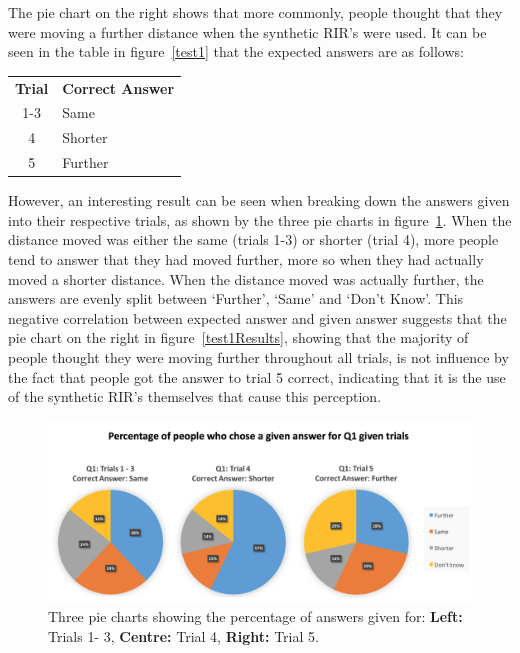 \documentclass[../../main.tex]{subfiles}
\begin{document}
			The pie chart on the right shows that more commonly, people thought that they were moving a further distance when the synthetic \ac{RIR}'s were used. It can be seen in the table in figure~\ref{test1} that the expected answers are as follows:

			\begin{center}
			\begin{tabular}{c l}
			\textbf{Trial} & \textbf{Correct Answer} \\
			1-3 & Same \\
			4 & Shorter \\
			5 & Further
			\end{tabular}
			\end{center}

			However, an interesting result can be seen when breaking down the answers given into their respective trials, as shown by the three pie charts in figure~\ref{Q1Trials}. When the distance moved was either the same (trials 1-3) or shorter (trial 4), more people tend to answer that they had moved further, more so when they had actually moved a shorter distance. When the distance moved was actually further, the answers are evenly split between `Further', `Same' and `Don't Know'. This negative correlation between expected answer and given answer suggests that the pie chart on the right in figure~\ref{test1Results}, showing that the majority of people thought they were moving further throughout all trials, is not influence by the fact that people got the answer to trial 5 correct, indicating that it is the use of the synthetic \ac{RIR}'s themselves that cause this perception.


			\begin{figure}[H]
				\centerline{\includegraphics[scale = 0.6]{Sections/userTesting/images/test1/Q1Trials.png}}
				\caption{Three pie charts showing the percentage of answers given for: \textbf{Left:} Trials 1- 3, \textbf{Centre:} Trial 4, \textbf{Right:} Trial 5.}
				\label{Q1Trials}
			\end{figure}
\end{document}
